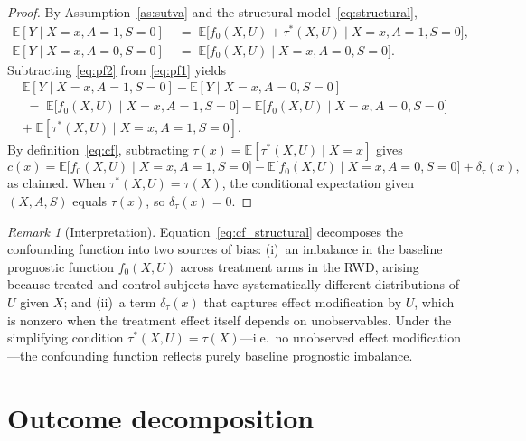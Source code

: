 \documentclass[10pt]{article}
\theoremstyle{plain}
\theoremstyle{definition}
\theoremstyle{remark}
\newtheorem{remark}{Remark}
\newcommand{\E}{\mathbb{E}}
\newcommand{\CATE}{\tau}
\newcommand{\cf}{c}
\begin{document}
\begin{proof}
  By Assumption~\ref{as:sutva} and the structural model~\eqref{eq:structural},
  \begin{align}
    \E[Y \mid X{=}x, A{=}1, S{=}0] &\;=\; \E\bigl[f_0(X,U) + \CATE^*(X,U) \mid X{=}x, A{=}1, S{=}0\bigr], \label{eq:pf1}\\[4pt]
    \E[Y \mid X{=}x, A{=}0, S{=}0] &\;=\; \E\bigl[f_0(X,U) \mid X{=}x, A{=}0, S{=}0\bigr]. \label{eq:pf2}
  \end{align}
  Subtracting \eqref{eq:pf2} from \eqref{eq:pf1} yields
  \begin{multline*}
    \E[Y \mid X{=}x, A{=}1, S{=}0] - \E[Y \mid X{=}x, A{=}0, S{=}0] \\
    \;=\; \E\bigl[f_0(X,U) \mid X{=}x, A{=}1, S{=}0\bigr] - \E\bigl[f_0(X,U) \mid X{=}x, A{=}0, S{=}0\bigr] \\
    +\; \E[\CATE^*(X,U) \mid X{=}x, A{=}1, S{=}0].
  \end{multline*}
  By definition~\eqref{eq:cf}, subtracting $\CATE(x) = \E[\CATE^*(X,U) \mid X=x]$ gives
  \begin{equation*}
    \cf(x) = \E\bigl[f_0(X,U) \mid X{=}x, A{=}1, S{=}0\bigr] - \E\bigl[f_0(X,U) \mid X{=}x, A{=}0, S{=}0\bigr] + \delta_\tau(x),
  \end{equation*}
  as claimed. When $\CATE^*(X,U) = \CATE(X)$, the conditional expectation given $(X, A, S)$ equals $\CATE(x)$, so $\delta_\tau(x) = 0$.
\end{proof}

\begin{remark}[Interpretation]
  Equation~\eqref{eq:cf_structural} decomposes the confounding function into two sources of bias: (i)~an imbalance in the baseline prognostic function $f_0(X,U)$ across treatment arms in the RWD, arising because treated and control subjects have systematically different distributions of $U$ given $X$; and (ii)~a term $\delta_\tau(x)$ that captures effect modification by $U$, which is nonzero when the treatment effect itself depends on unobservables. Under the simplifying condition $\CATE^*(X,U) = \CATE(X)$---i.e.\ no unobserved effect modification---the confounding function reflects purely baseline prognostic imbalance.
\end{remark}

\section{Outcome decomposition}
\end{document}
